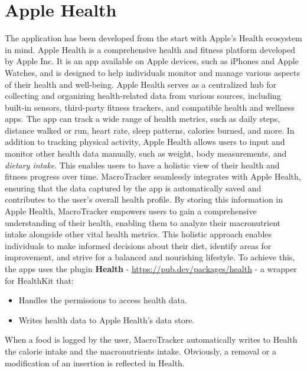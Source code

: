 \documentclass{Configuration_Files/PoliMi3i_thesis}
\begin{document}
\section{Apple Health}
The application has been developed from the start with Apple's Health ecosystem in mind.
Apple Health is a comprehensive health and fitness platform developed by Apple Inc. It is an app available on Apple devices, such as iPhones and Apple Watches, and is designed to help individuals monitor and manage various aspects of their health and well-being.
Apple Health serves as a centralized hub for collecting and organizing health-related data from various sources, including built-in sensors, third-party fitness trackers, and compatible health and wellness apps. The app can track a wide range of health metrics, such as daily steps, distance walked or run, heart rate, sleep patterns, calories burned, and more.
In addition to tracking physical activity, Apple Health allows users to input and monitor other health data manually, such as weight, body measurements, and \textit{dietary intake}. This enables users to have a holistic view of their health and fitness progress over time.
MacroTracker seamlessly integrates with Apple Health, ensuring that the data captured by the app is automatically saved and contributes to the user's overall health profile. By storing this information in Apple Health, MacroTracker empowers users to gain a comprehensive understanding of their health, enabling them to analyze their macronutrient intake alongside other vital health metrics. This holistic approach enables individuals to make informed decisions about their diet, identify areas for improvement, and strive for a balanced and nourishing lifestyle.
To achieve this, the apps uses the plugin \textbf{Health} - \url{https://pub.dev/packages/health} - a wrapper for HealthKit that:
\begin{itemize}
    \item Handles the permissions to access health data.
    \item Writes health data to Apple Health's data store. 
\end{itemize}

When a food is logged by the user, MacroTracker automatically writes to Health the calorie intake and the macronutrients intake. Obviously, a removal or a modification of an insertion is reflected in Health. 
\end{document}
